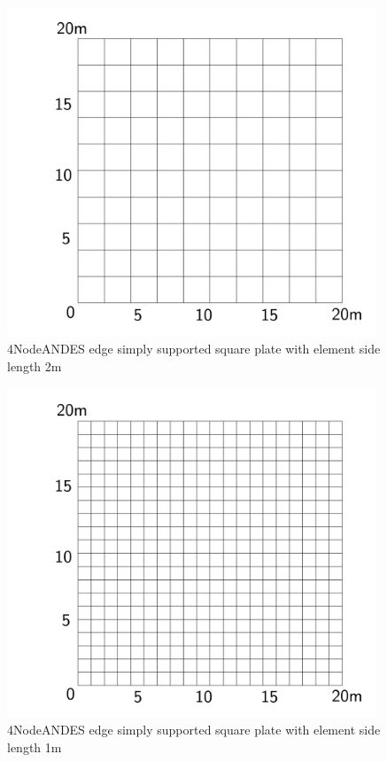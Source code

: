 \documentclass[fleqn,11pt]{article}
\begin{document}
\begin{figure}[H]
  \centering
  \includegraphics[width=11cm]{../Figure-files/square_plate3.pdf}
  \caption{4NodeANDES edge simply supported square plate with element side length 2m }
  \label{fig 4NodeANDES edges simply supported square plate with element side length 2m }
\end{figure}

\newpage

\begin{figure}[H]
  \centering
  \includegraphics[width=11cm]{../Figure-files/square_plate4.pdf}
  \caption{4NodeANDES edge simply supported square plate with element side length 1m }
  \label{fig 4NodeANDES edges simply supported square plate with element side length 1m }
\end{figure}
\end{document}
